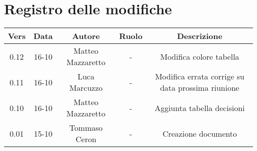 \section{Registro delle modifiche}

\begin{table}[htbp]
	\begin{tabular}{|c|c|c|c|c|}
		\hline
		\rowcolor[gray]{0.9}
		Vers & Data & Autore & Ruolo & Descrizione \\
		\hline
		0.12 & 16-10 & Matteo Mazzaretto & - & Modifica colore tabella \\
		\hline
		0.11 & 16-10 & Luca Marcuzzo & - & Modifica errata corrige su data prossima riunione \\
		\hline
		0.10 & 16-10 & Matteo Mazzaretto & - & Aggiunta tabella decisioni \\
		\hline
		0.01 & 15-10 & Tommaso Ceron & - & Creazione documento \\
		\hline
	\end{tabular}
\end{table}